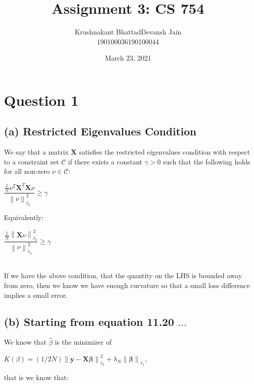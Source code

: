 \documentclass[fleqn, 11pt]{article}
\title{Assignment 3: CS 754}
\author{ 
\begin{tabular}{|c|c|}
     \hline
     \textsf{Krushnakant Bhattad} & \textsf{Devansh Jain} \\
     \hline
     \textsf{190100036} & \textsf{190100044}\\
     \hline
\end{tabular}
}
\date{March 23, 2021}
\newcommand{\bs}[1]{\boldsymbol{#1}}
\newcommand\norm[1]{\left\lVert#1\right\rVert}
\begin{document}
\maketitle
\tableofcontents
\thispagestyle{empty}
\setcounter{page}{0}

\newpage
\section*{Question 1}
\setcounter{equation}{0}


\subsection*{(a) Restricted Eigenvalues Condition}

We say that a matrix $\bs{X}$ satisfies the restricted eigenvalues condition 
with respect to a constraint set $\mathcal{C}$ 
if there exists a constant $\gamma>0$ such that the following holds 
for all non-zero $  \nu \in \mathcal{C} $:\\

\begin{center}
   $\dfrac{\frac{1}{N} \nu^T \bs{X}^T\bs{X} \nu }{ \norm{\nu}_{\ell_2}^2 } \geq \gamma $
\end{center}

Equivalently:

\begin{center}
   $\dfrac{\frac{1}{N} \norm{\bs{X} \nu}_{\ell_2}^2 }{ \norm{\nu}_{\ell_2}^2 } \geq \gamma $
\end{center}

 
~\\If we have the above condition, that the quantity on the LHS is bounded away from zero, 
then we know we have enough curvature so that a small loss difference implies a small error.



\subsection*{(b) Starting from equation 11.20 $\ldots$}

We know that $\hat{\beta}$ is the minimizer of 

\begin{center}
    $K(\beta)= (1/2N) \norm{\bs{y-X \beta}}_{\ell_2}^2 + \lambda_N \norm{\bs{\beta}}_{\ell_1} $, 
\end{center}

that is we know that:
\end{document}
